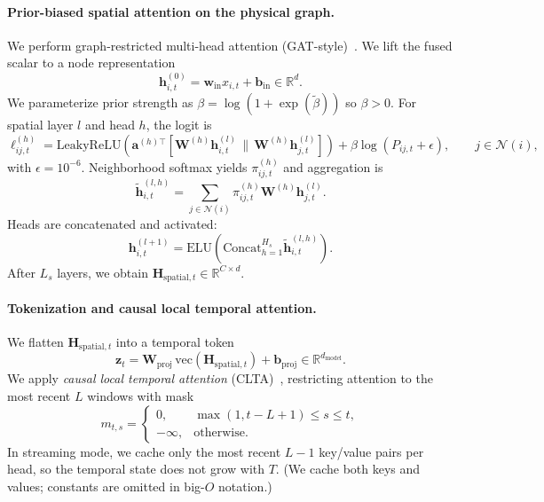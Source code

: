 \documentclass[preprint,12pt]{elsarticle}
\begin{document}
\paragraph{Prior-biased spatial attention on the physical graph.}
We perform graph-restricted multi-head attention (GAT-style)~\cite{velivckovic2017graph}.
We lift the fused scalar to a node representation
\begin{equation}
\mathbf{h}^{(0)}_{i,t}
=
\mathbf{w}_{\mathrm{in}} x_{i,t} + \mathbf{b}_{\mathrm{in}}
\in \mathbb{R}^{d}.
\label{eq:node_embed}
\end{equation}
We parameterize prior strength as $\beta=\log(1+\exp(\tilde{\beta}))$ so $\beta>0$.
For spatial layer $l$ and head $h$, the logit is
\begin{equation}
\ell^{(h)}_{ij,t}
=
\mathrm{LeakyReLU}\!\left(
\mathbf{a}^{(h)\top}
\left[
\mathbf{W}^{(h)}\mathbf{h}^{(l)}_{i,t}\,\|\,\mathbf{W}^{(h)}\mathbf{h}^{(l)}_{j,t}
\right]
\right)
+
\beta\log(P_{ij,t}+\epsilon),
\qquad j\in\mathcal{N}(i),
\label{eq:spatial_logit}
\end{equation}
with $\epsilon=10^{-6}$.
Neighborhood softmax yields $\pi^{(h)}_{ij,t}$ and aggregation is
\begin{equation}
\tilde{\mathbf{h}}^{(l,h)}_{i,t}
=
\sum_{j\in\mathcal{N}(i)}\pi^{(h)}_{ij,t}\mathbf{W}^{(h)}\mathbf{h}^{(l)}_{j,t}.
\label{eq:spatial_agg}
\end{equation}
Heads are concatenated and activated:
\begin{equation}
\mathbf{h}^{(l+1)}_{i,t}
=
\mathrm{ELU}\!\left(\mathrm{Concat}_{h=1}^{H_s}\tilde{\mathbf{h}}^{(l,h)}_{i,t}\right).
\label{eq:head_concat}
\end{equation}
After $L_s$ layers, we obtain $\mathbf{H}_{\mathrm{spatial},t}\in\mathbb{R}^{C\times d}$.

\paragraph{Tokenization and causal local temporal attention.}
We flatten $\mathbf{H}_{\mathrm{spatial},t}$ into a temporal token
\begin{equation}
\mathbf{z}_t
=
\mathbf{W}_{\mathrm{proj}}\,\mathrm{vec}(\mathbf{H}_{\mathrm{spatial},t})
+
\mathbf{b}_{\mathrm{proj}}
\in\mathbb{R}^{d_{\mathrm{model}}}.
\label{eq:temporal_token}
\end{equation}
We apply \emph{causal local temporal attention} (CLTA)~\cite{vaswani2017attention}, restricting attention to the most recent $L$ windows with mask
\begin{equation}
m_{t,s}
=
\begin{cases}
0, & \max(1,t-L+1)\le s\le t,\\
-\infty, & \text{otherwise}.
\end{cases}
\label{eq:causal_mask}
\end{equation}
In streaming mode, we cache only the most recent $L-1$ key/value pairs per head, so the temporal state does not grow with $T$.
(We cache both keys and values; constants are omitted in big-$O$ notation.)
\end{document}
